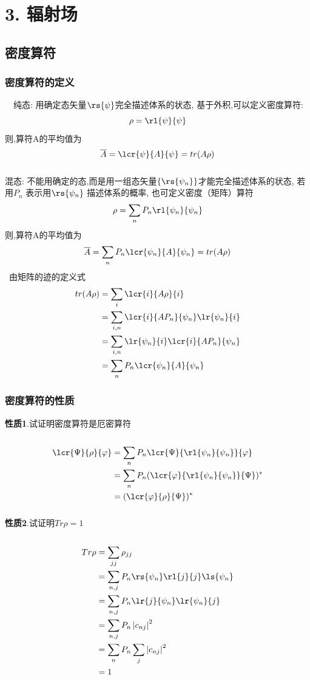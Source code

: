 \section{3. 辐射场}
\subsection{密度算符}
\begin{frame}
    \frametitle{密度算符的定义}
      纯态: 用确定态矢量$\rs{\psi}$完全描述体系的状态, 基于外积,可以定义密度算符:
    \[ \rho =\rl{\psi}{\psi} \]
    则,算符A的平均值为
    \[ \overline{A} =\lcr{\psi}{A}{\psi} =tr(A\rho)\]
\end{frame}

\begin{frame}
    \frametitle{}
    混态: 不能用确定的态,而是用一组态矢量$\{ \rs{\psi_n}\}$才能完全描述体系的状态, 若用$P_n$ 表示用$\rs{\psi_n}$ 描述体系的概率, 也可定义密度（矩阵）算符
    \[ \rho =\sum_nP_n\rl{\psi_n}{\psi_n} \]
    则,算符A的平均值为
    \[ \overline{A} =\sum_n P_n\lcr{\psi_n}{A}{\psi_n} =tr(A\rho)\]
    \证~由矩阵的迹的定义式  
    \[\begin{aligned}
        tr(A\rho) &= \sum_i \lcr{i}{A\rho}{i} \\
        &= \sum_{i,n} \lcr{i}{AP_n}{\psi_n}\lr{\psi_n}{i} \\
        &= \sum_{i,n} \lr{\psi_n}{i} \lcr{i}{AP_n}{\psi_n}\\
        &= \sum_{n} P_n\lcr{\psi_n}{A}{\psi_n}
    \end{aligned}\]  
\end{frame}

\begin{frame}
    \frametitle{密度算符的性质}
    \textbf{性质1}.试证明密度算符是厄密算符 \\ 
    \证~
    \[ \begin{aligned}
      \lcr{\Psi}{\rho}{\varphi} &= \sum_n P_n\lcr{\Psi}{\rl{\psi_n}{\psi_n}}{\varphi} \\
      &= \sum_n P_n(\lcr{\varphi}{\rl{\psi_n}{\psi_n}}{\Psi})^* \\
      &= (\lcr{\varphi}{\rho}{\Psi})^* 
\end{aligned} \]    
\end{frame}

\begin{frame}
    \frametitle{}
    \textbf{性质2}.试证明$Tr \rho=1$ \\ 
    \证~
    \[ \begin{aligned}
      Tr \rho &= \sum_{jj} \rho_{jj} \\ 
      &= \sum_{n,j} P_n\rs{\psi_n} \rl{j}{j} \ls{\psi_n} \\
      &= \sum_{n,j} P_n \lr{j}{\psi_n} \lr{\psi_n}{j} \\
      &= \sum_{n,j} P_n \left|c_{nj}\right|^2 \\
      &= \sum_{n} P_n \sum_{j}\left|c_{nj}\right|^2 \\
      &=1
\end{aligned} \]   
\end{frame}

